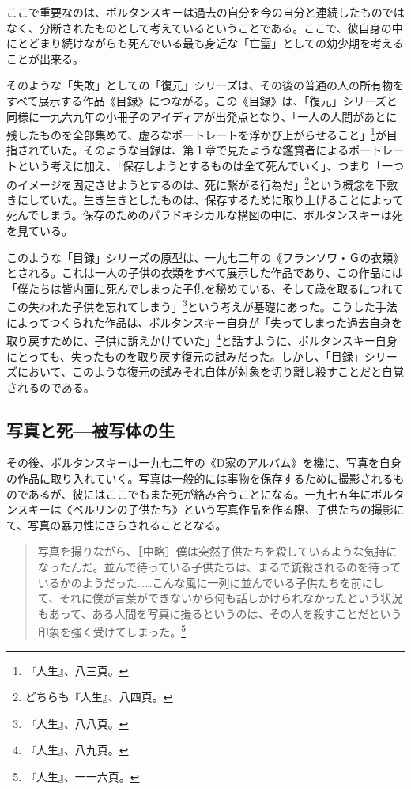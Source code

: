 \documentclass[b5j,twoside,twocolumn]{utarticle}
\begin{document}
ここで重要なのは、ボルタンスキーは過去の自分を今の自分と連続したものではなく、分断されたものとして考えているということである。ここで、彼自身の中にとどまり続けながらも死んでいる最も身近な「亡霊」としての幼少期を考えることが出来る。


そのような「失敗」としての「復元」シリーズは、その後の普通の人の所有物をすべて展示する作品《目録》につながる。この《目録》は、「復元」シリーズと同様に一九六九年の小冊子のアイディアが出発点となり、「一人の人間があとに残したものを全部集めて、虚ろなポートレートを浮かび上がらせること」\footnote{『人生』、八三頁。}が目指されていた。そのような目録は、第１章で見たような鑑賞者によるポートレートという考えに加え、「保存しようとするものは全て死んでいく」、つまり「一つのイメージを固定させようとするのは、死に繋がる行為だ」\footnote{どちらも『人生』、八四頁。}という概念を下敷きにしていた。生き生きとしたものは、保存するために取り上げることによって死んでしまう。保存のためのパラドキシカルな構図の中に、ボルタンスキーは死を見ている。


このような「目録」シリーズの原型は、一九七二年の《フランソワ・Ｇの衣類》とされる。これは一人の子供の衣類をすべて展示した作品であり、この作品には「僕たちは皆内面に死んでしまった子供を秘めている、そして歳を取るにつれてこの失われた子供を忘れてしまう」\footnote{『人生』、八八頁。}という考えが基礎にあった。こうした手法によってつくられた作品は、ボルタンスキー自身が「失ってしまった過去自身を取り戻すために、子供に訴えかけていた」\footnote{『人生』、八九頁。}と話すように、ボルタンスキー自身にとっても、失ったものを取り戻す復元の試みだった。しかし、「目録」シリーズにおいて、このような復元の試みそれ自体が対象を切り離し殺すことだと自覚されるのである。

\subsection{\tbaselineshift =4.0pt 写真と死---被写体の生}
その後、ボルタンスキーは一九七二年の《D家のアルバム》を機に、写真を自身の作品に取り入れていく。写真は一般的には事物を保存するために撮影されるものであるが、彼にはここでもまた死が絡み合うことになる。一九七五年にボルタンスキーは《ベルリンの子供たち》という写真作品を作る際、子供たちの撮影にて、写真の暴力性にさらされることとなる。

\begin{quote}
写真を撮りながら、［中略］僕は突然子供たちを殺しているような気持になったんだ。並んで待っている子供たちは、まるで銃殺されるのを待っているかのようだった……こんな風に一列に並んでいる子供たちを前にして、それに僕が言葉ができないから何も話しかけられなかったという状況もあって、ある人間を写真に撮るというのは、その人を殺すことだという印象を強く受けてしまった。\footnote{『人生』、一一六頁。}
\end{quote}
\end{document}
